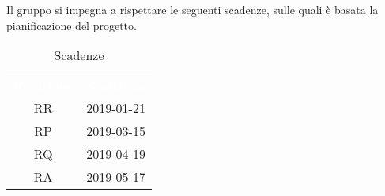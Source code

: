Il gruppo \gruppo\space si impegna a rispettare le seguenti scadenze, sulle quali
è basata la pianificazione del progetto.

\renewcommand{\arraystretch}{1.5}
\begin{table}[H]	
	\begin{center}
	    \begin{tabular}{ c  c  }
	        \rowcolor{greySWEight}
	        \textcolor{white}{\textbf{Revisione}} & \textcolor{white}{\textbf{Scadenza}}\\
	        RR & 2019-01-21 \\
	        RP & 2019-03-15 \\
	        RQ & 2019-04-19 \\
	        RA & 2019-05-17 \\
	    \end{tabular}
	    \caption{Scadenze} \label{tab:tabellascadenze} 
	\end{center}
\end{table}

   